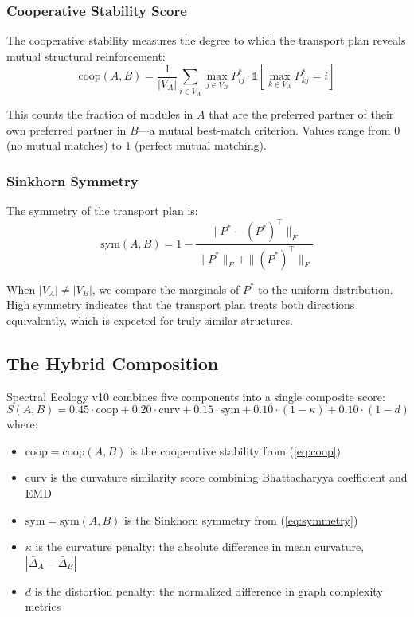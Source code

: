 \documentclass{../yalumba}
\begin{document}
\subsubsection{Cooperative Stability Score}

The cooperative stability measures the degree to which the transport plan
reveals mutual structural reinforcement:
\begin{equation}
\text{coop}(A,B) = \frac{1}{|V_A|} \sum_{i \in V_A} \max_{j \in V_B}
P^*_{ij} \cdot \mathbb{1}\!\left[\max_{k \in V_A} P^*_{kj} = i\right]
\label{eq:coop}
\end{equation}

This counts the fraction of modules in $A$ that are the preferred partner
of their own preferred partner in $B$---a mutual best-match criterion.
Values range from 0 (no mutual matches) to 1 (perfect mutual matching).

\subsubsection{Sinkhorn Symmetry}

The symmetry of the transport plan is:
\begin{equation}
\text{sym}(A,B) = 1 - \frac{\|P^* - (P^*)^\top\|_F}
{\|P^*\|_F + \|(P^*)^\top\|_F}
\label{eq:symmetry}
\end{equation}

When $|V_A| \neq |V_B|$, we compare the marginals of $P^*$ to the
uniform distribution.  High symmetry indicates that the transport plan
treats both directions equivalently, which is expected for truly similar
structures.

\subsection{The Hybrid Composition}

Spectral Ecology v10 combines five components into a single composite
score:
\begin{equation}
\boxed{
S(A,B) = 0.45 \cdot \text{coop} + 0.20 \cdot \text{curv}
+ 0.15 \cdot \text{sym} + 0.10 \cdot (1 - \kappa) + 0.10 \cdot (1 - d)
}
\label{eq:composite}
\end{equation}
where:
\begin{itemize}
\item $\text{coop} = \text{coop}(A,B)$ is the cooperative stability
  from (\ref{eq:coop})
\item $\text{curv}$ is the curvature similarity score combining
  Bhattacharyya coefficient and EMD
\item $\text{sym} = \text{sym}(A,B)$ is the Sinkhorn symmetry
  from (\ref{eq:symmetry})
\item $\kappa$ is the curvature penalty: the absolute difference
  in mean curvature, $|\bar\Delta_A - \bar\Delta_B|$
\item $d$ is the distortion penalty: the normalized difference in
  graph complexity metrics
\end{itemize}
\end{document}
